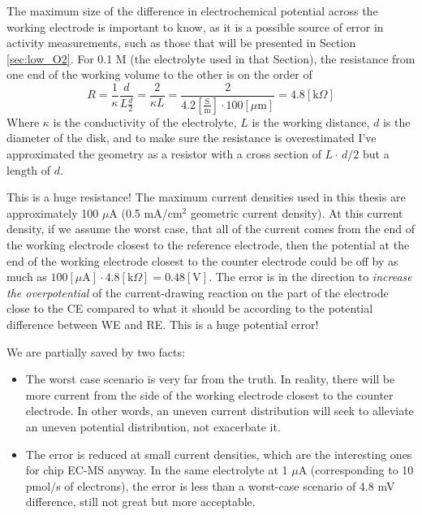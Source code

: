 The maximum size of the difference in electrochemical potential across the working electrode is important to know, as it is a possible source of error in activity measurements, such as those that will be presented in Section \ref{sec:low_O2}. For 0.1 M  (the electrolyte used in that Section), the resistance from one end of the working volume to the other is on the order of
\begin{equation}
R = \frac{1}{\kappa}\frac{d}{L\frac{d}{2}} = \frac{2}{\kappa L} = \frac{2}{4.2 \left[\frac{\text{S}}{\text{m}}\right]\cdot 100[\mu\text{m}]} = 4.8 [\text{k}\Omega]
\end{equation}
Where $\kappa$ is the conductivity of the electrolyte, $L$ is the working distance, $d$ is the diameter of the disk, and to make sure the resistance is overestimated I've approximated the geometry as a resistor with a cross section of $L\cdot\, d/2$ but a length of $d$. 

This is a huge resistance! The maximum current densities used in this thesis are approximately 100 $\mu$A (0.5 mA/cm$^2$ geometric current density). At this current density, if we assume the worst case, that all of the current comes from the end of the working electrode closest to the reference electrode, then the potential at the end of the working electrode closest to the counter electrode could be off by as much as $100[\mu\text{A}]\cdot4.8 [\text{k}\Omega] = 0.48[\text{V}]$. The error is in the direction to \textit{increase the overpotential} of the current-drawing reaction on the part of the electrode close to the CE compared to what it should be according to the potential difference between WE and RE. This is a huge potential error! 

We are partially saved by two facts:
\begin{itemize}
	\item The worst case scenario is very far from the truth. In reality, there will be more current from the side of the working electrode closest to the counter electrode. In other words, an uneven current distribution will seek to alleviate an uneven potential distribution, not exacerbate it.
	
	\item The error is reduced at small current densities, which are the interesting ones for chip EC-MS anyway. In the same electrolyte at 1 $\mu$A (corresponding to 10 pmol/s of electrons), the error is less than a worst-case scenario of 4.8 mV difference, still not great but more acceptable.
\end{itemize}


